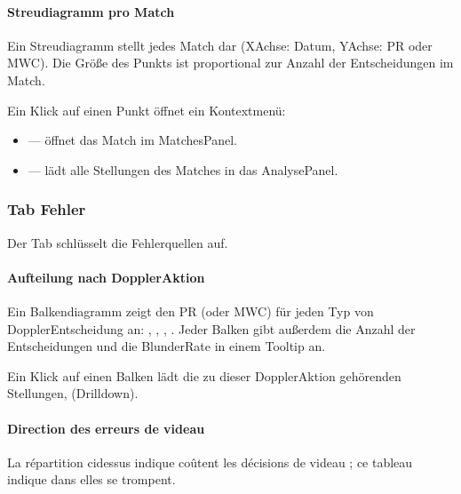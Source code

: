 \documentclass[letterpaper,10pt,german]{sphinxmanual}
\begin{document}
\paragraph{Streudiagramm pro Match}
\label{\detokenize{manuel:scatter-plot-par-match}}
\sphinxAtStartPar
Ein Streudiagramm stellt jedes Match dar (X\sphinxhyphen{}Achse: Datum, Y\sphinxhyphen{}Achse: PR oder MWC). Die Größe des Punkts ist proportional zur Anzahl der Entscheidungen im Match.

\sphinxAtStartPar
Ein Klick auf einen Punkt öffnet ein Kontextmenü:
\begin{itemize}
\item {} 
\sphinxAtStartPar
{} — öffnet das Match im Matches\sphinxhyphen{}Panel.

\item {} 
\sphinxAtStartPar
{} — lädt alle Stellungen des Matches in das Analyse\sphinxhyphen{}Panel.

\end{itemize}


\subsubsection{Tab Fehler}
\label{\detokenize{manuel:onglet-erreurs}}
\sphinxAtStartPar
Der Tab  schlüsselt die Fehlerquellen auf.


\paragraph{Aufteilung nach Doppler\sphinxhyphen{}Aktion}
\label{\detokenize{manuel:repartition-par-action-de-videau}}
\sphinxAtStartPar
Ein Balkendiagramm zeigt den PR (oder MWC) für jeden Typ von Doppler\sphinxhyphen{}Entscheidung an: , , , . Jeder Balken gibt außerdem die Anzahl der Entscheidungen und die Blunder\sphinxhyphen{}Rate in einem Tooltip an.

\sphinxAtStartPar
Ein Klick auf einen Balken lädt die zu dieser Doppler\sphinxhyphen{}Aktion gehörenden Stellungen,  (Drill\sphinxhyphen{}down).


\paragraph{Direction des erreurs de videau}
\label{\detokenize{manuel:direction-des-erreurs-de-videau}}
\sphinxAtStartPar
La répartition ci\sphinxhyphen{}dessus indique  coûtent les décisions de videau ;
ce tableau indique dans  elles se trompent.
\end{document}

